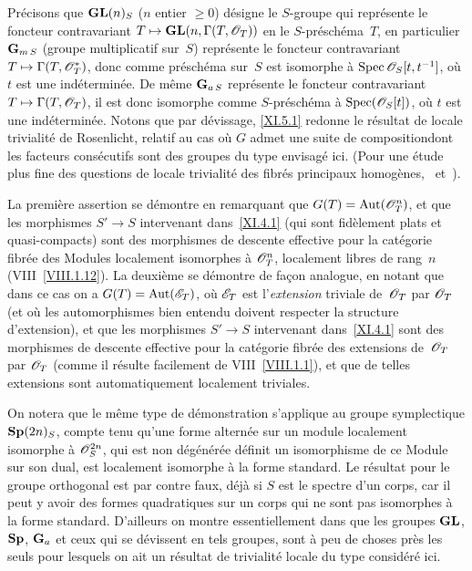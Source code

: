 Pr\'ecisons que $\operatorname{\mathbf{GL}}(n)_S$ ($n$ entier $\geq 0$) d\'esigne le
$S$-groupe qui repr\'esente le foncteur contravariant $T\mto
\Gl(n,\Gamma(T,\cal{O}_T))$ en le $S$-pr\'esch\'ema~$T$, en
particulier $\mathbf{G}_{m\,S}$ (\og groupe multiplicatif sur~$S$\fg)
repr\'esente le foncteur contravariant $T\mto
\Gamma(T,\cal{O}_T^*)$, donc comme pr\'esch\'ema sur~$S$ est
isomorphe \`a $\Spec {\cal{O}_S[t,t^{-1}]}$, o\`u $t$ est une
ind\'etermin\'ee. De m\^eme $\mathbf{G}_{a\,S}$ repr\'esente le
foncteur contravariant $T\mto \Gamma(T,\cal{O}_T)$, il est donc
isomorphe comme $S$-pr\'esch\'ema \`a $\Spec(\cal{O}_S[t])$,
o\`u $t$ est une ind\'etermin\'ee. Notons que par d\'evissage,
\ref{XI.5.1} redonne le r\'esultat de locale trivialit\'e de
Rosenlicht, relatif au cas o\`u $G$ admet une \og suite de
composition\fg dont les facteurs cons\'ecutifs sont des groupes du
type envisag\'e ici. (Pour une \'etude plus fine des questions de
locale trivialit\'e des fibr\'es principaux homog\`enes,
\cf \cite{XI.7}~et~\cite{XI.3}).

La premi\`ere assertion se d\'emontre en remarquant que
$G(T)=\Aut(\cal{O}_T^n)$, et que les morphismes $S'\to S$ intervenant
dans~\ref{XI.4.1} (\ie qui sont fid\`element plats et
quasi-compacts) sont des morphismes de descente effective pour la
cat\'egorie fibr\'ee des Modules localement isomorphes \`a
$\cal{O}_T^n$, \ie localement libres de rang~$n$
(VIII~\ref{VIII.1.12}). La deuxi\`eme se d\'emontre de fa\c con
analogue, en notant que dans ce cas on a $G(T)=\Aut(\cal{E}_T)$,
o\`u $\cal{E}_T$ est l'\emph{extension} triviale de~$\cal{O}_T$ par
$\cal{O}_T$ (et o\`u les automorphismes bien entendu doivent
respecter la structure d'extension), et que les morphismes $S'\to S$
intervenant dans~\ref{XI.4.1} sont des morphismes de descente
effective pour la cat\'egorie fibr\'ee des extensions de~$\cal{O}_T$ par $\cal{O}_T$ (comme il r\'esulte facilement de
VIII~\ref{VIII.1.1}), et que de telles extensions sont automatiquement
localement triviales.

\begin{remarque}
\label{XI.5.2}
On notera que le m\^eme type de d\'emonstration s'applique au
groupe symplectique $\operatorname{\mathbf{Sp}}(2n)_S$, compte tenu qu'une forme
altern\'ee sur un module localement isomorphe \`a
$\cal{O}_S^{2n}$, qui est \og non d\'eg\'en\'er\'ee\fg
\ie d\'efinit un isomorphisme de ce Module sur son dual, est
localement isomorphe \`a la forme standard. Le r\'esultat pour le
groupe orthogonal est par contre faux, d\'ej\`a si $S$ est le
spectre d'un corps, car il peut y avoir des formes
quadratiques sur un corps qui ne sont pas isomorphes \`a la forme
standard. D'ailleurs on montre essentiellement dans \cite{XI.3} que les
groupes $\operatorname{\mathbf{GL}}$, $\operatorname{\mathbf{Sp}}$, $\mathbf{G}_a$ et ceux qui se d\'evissent en tels
groupes, sont \`a peu de choses pr\`es les seuls pour lesquels on
ait un r\'esultat de trivialit\'e locale du type consid\'er\'e
ici.
\end{remarque}

